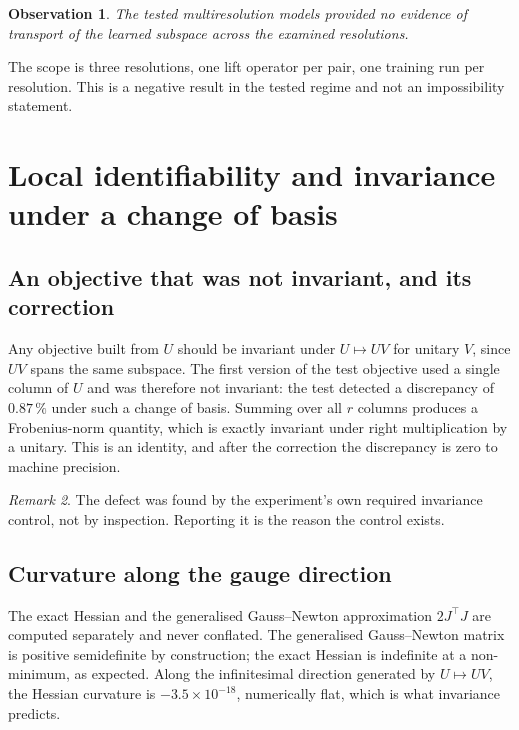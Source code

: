\documentclass[11pt]{amsart}
\newtheorem{observation}{Observation}[section]
\theoremstyle{remark}
\newtheorem{remark}[observation]{Remark}
\begin{document}
\begin{observation}
\label{obs:transport}
The tested multiresolution models provided no evidence of transport of the learned subspace
across the examined resolutions.
\end{observation}

The scope is three resolutions, one lift operator per pair, one training run per
resolution. This is a negative result in the tested regime and not an impossibility
statement.

\section{Local identifiability and invariance under a change of basis}
\label{sec:identifiability}

\subsection{An objective that was not invariant, and its correction}

Any objective built from $U$ should be invariant under $U\mapsto UV$ for unitary $V$, since
$UV$ spans the same subspace. The first version of the test objective used a single column
of $U$ and was therefore not invariant: the test detected a discrepancy of $0.87\,\%$ under
such a change of basis. Summing over all $r$ columns produces a Frobenius-norm quantity,
which is exactly invariant under right multiplication by a unitary. This is an identity,
and after the correction the discrepancy is zero to machine precision.

\begin{remark}
\label{rem:owncontrol}
The defect was found by the experiment's own required invariance control, not by inspection.
Reporting it is the reason the control exists.
\end{remark}

\subsection{Curvature along the gauge direction}

The exact Hessian and the generalised Gauss--Newton approximation $2J^{\top}J$ are computed
separately and never conflated. The generalised Gauss--Newton matrix is positive
semidefinite by construction; the exact Hessian is indefinite at a non-minimum, as expected.
Along the infinitesimal direction generated by $U\mapsto UV$, the Hessian curvature is
$-3.5\times10^{-18}$, numerically flat, which is what invariance predicts.
\end{document}
